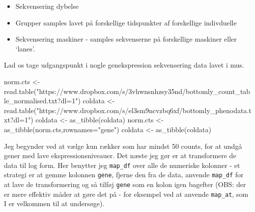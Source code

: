\documentclass[
]{book}
\newenvironment{Shaded}{\begin{snugshade}}{\end{snugshade}}
\newcommand{\AttributeTok}[1]{\textcolor[rgb]{0.77,0.63,0.00}{#1}}
\newcommand{\FunctionTok}[1]{\textcolor[rgb]{0.00,0.00,0.00}{#1}}
\newcommand{\NormalTok}[1]{#1}
\newcommand{\OtherTok}[1]{\textcolor[rgb]{0.56,0.35,0.01}{#1}}
\newcommand{\StringTok}[1]{\textcolor[rgb]{0.31,0.60,0.02}{#1}}
\providecommand{\tightlist}{%
  \setlength{\itemsep}{0pt}\setlength{\parskip}{0pt}}
\begin{document}
\begin{itemize}
\tightlist
\item
  Sekvensering dybelse
\item
  Grupper samples lavet på forskellige tidspunkter af forskellige indivduelle
\item
  Sekvensering maskiner - samples sekvenserne på forskellige maskiner eller `lanes'.
\end{itemize}

Lad os tage udgangspunkt i nogle genekspression sekvensering data lavet i mus.

\begin{Shaded}
\begin{Highlighting}[]
\NormalTok{norm.cts }\OtherTok{\textless{}{-}} \FunctionTok{read.table}\NormalTok{(}\StringTok{"https://www.dropbox.com/s/3vhwnsnhzsy35nd/bottomly\_count\_table\_normalised.txt?dl=1"}\NormalTok{)}
\NormalTok{coldata }\OtherTok{\textless{}{-}} \FunctionTok{read.table}\NormalTok{(}\StringTok{"https://www.dropbox.com/s/el3sm9ncvzbq6xf/bottomly\_phenodata.txt?dl=1"}\NormalTok{)}
\NormalTok{coldata }\OtherTok{\textless{}{-}} \FunctionTok{as\_tibble}\NormalTok{(coldata)}
\NormalTok{norm.cts }\OtherTok{\textless{}{-}} \FunctionTok{as\_tibble}\NormalTok{(norm.cts,}\AttributeTok{rownames=}\StringTok{"gene"}\NormalTok{)}
\NormalTok{coldata }\OtherTok{\textless{}{-}} \FunctionTok{as\_tibble}\NormalTok{(coldata)}
\end{Highlighting}
\end{Shaded}

Jeg begynder ved at vælge kun rækker som har mindst 50 counts, for at undgå gener med lave ekspressionsniveauer. Det næste jeg gør er at transformere de data til log form. Her benytter jeg \texttt{map\_df} over alle de numeriske kolonner - et strategi er at gemme kolonnen \texttt{gene}, fjerne den fra de data, anvende \texttt{map\_df} for at lave de transformering og så tilføj \texttt{gene} som en kolon igen bagefter (OBS: der er mere effektiv måder at gøre det på - for eksempel ved at anvende \texttt{map\_at}, som I er velkommen til at undersøge).
\end{document}

